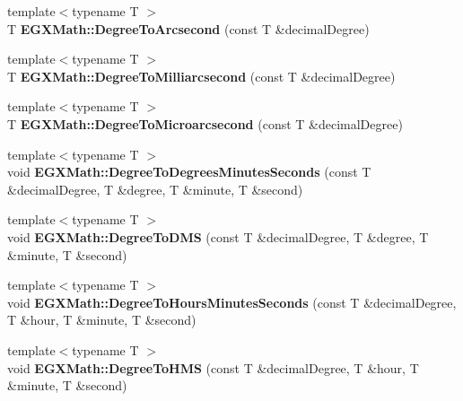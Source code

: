 \begin{DoxyCompactItemize}
\item 
\mbox{\label{group___angle_conversions_gaf85e2d765c248f447854a807a68a5de8}} 
{\footnotesize template$<$typename T $>$ }\\T {\bfseries E\+G\+X\+Math\+::\+Degree\+To\+Arcsecond} (const T \&decimal\+Degree)
\item 
\mbox{\label{group___angle_conversions_ga2c218e286b2ef72a00734dbc5a7f5ab6}} 
{\footnotesize template$<$typename T $>$ }\\T {\bfseries E\+G\+X\+Math\+::\+Degree\+To\+Milliarcsecond} (const T \&decimal\+Degree)
\item 
\mbox{\label{group___angle_conversions_ga31b65388fe1b4656663b3d66b9d764e6}} 
{\footnotesize template$<$typename T $>$ }\\T {\bfseries E\+G\+X\+Math\+::\+Degree\+To\+Microarcsecond} (const T \&decimal\+Degree)
\item 
\mbox{\label{group___angle_conversions_ga1b244e5ea02401c46d56f3bda1d81376}} 
{\footnotesize template$<$typename T $>$ }\\void {\bfseries E\+G\+X\+Math\+::\+Degree\+To\+Degrees\+Minutes\+Seconds} (const T \&decimal\+Degree, T \&degree, T \&minute, T \&second)
\item 
\mbox{\label{group___angle_conversions_ga7eb8f0b012002f2cfa4d78a7ca0299de}} 
{\footnotesize template$<$typename T $>$ }\\void {\bfseries E\+G\+X\+Math\+::\+Degree\+To\+D\+MS} (const T \&decimal\+Degree, T \&degree, T \&minute, T \&second)
\item 
\mbox{\label{group___angle_conversions_ga770b13da33b6f6c7bfa398cca7f24dbe}} 
{\footnotesize template$<$typename T $>$ }\\void {\bfseries E\+G\+X\+Math\+::\+Degree\+To\+Hours\+Minutes\+Seconds} (const T \&decimal\+Degree, T \&hour, T \&minute, T \&second)
\item 
\mbox{\label{group___angle_conversions_ga0bb223ca6e77b00439a6d910ab32d82e}} 
{\footnotesize template$<$typename T $>$ }\\void {\bfseries E\+G\+X\+Math\+::\+Degree\+To\+H\+MS} (const T \&decimal\+Degree, T \&hour, T \&minute, T \&second)

\end{DoxyCompactItemize}
